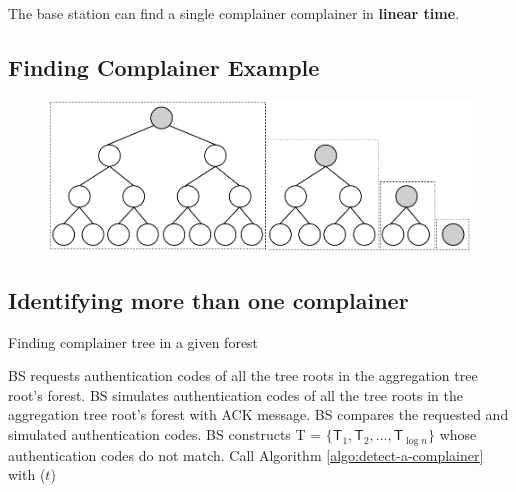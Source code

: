 \documentclass[%
  slidesonly,%
  semlayer%
  ]{seminar}                                  %
\begin{document}
\begin{slide}
        The base station can find a single complainer complainer in \textbf{linear time}.

        \vfill
        \clearpage

    \subsection*{Finding Complainer Example}
      \vfill
        \begin{figure}[t]
          \centering
          \includegraphics[scale=0.4]{images/forest.png}
        \end{figure}
      \vfill
      \clearpage

    \subsection*{Identifying more than one complainer}
        \vfill
        
        \begin{algorithm}
          \caption{Finding complainer tree in a given forest}
          \label{algo:detect-a-complainer-tree}
          \begin{algorithmic}[1]
            \STATE BS requests authentication codes of all the tree roots in the aggregation tree root's forest.
            \STATE BS simulates authentication codes of all the tree roots in the aggregation tree root's forest with ACK message.
            \STATE BS compares the requested and simulated authentication codes.
            \STATE BS constructs \textsf{T} = $\{\textsf{T}_{1},\textsf{T}_{2},\dotsc,\textsf{T}_{\log{n}}\}$ whose authentication codes do not match.
              \STATE Call Algorithm \ref{algo:detect-a-complainer} with ($t$)     
            \ENDFOR 
          \end{algorithmic}
        \end{algorithm}


\end{slide}
\end{document}

